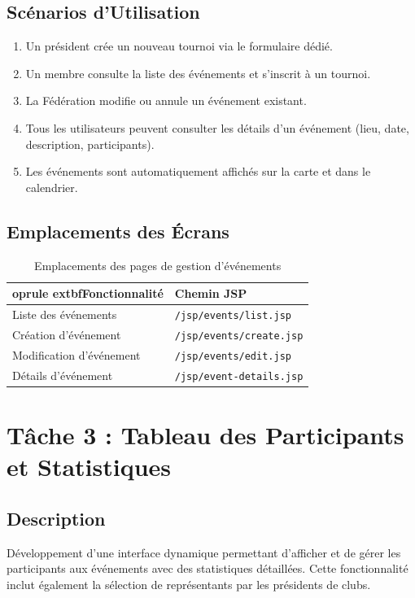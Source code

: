 \documentclass[12pt,a4paper]{article}
\begin{document}
\subsection{Scénarios d'Utilisation}
\begin{enumerate}
    \item Un président crée un nouveau tournoi via le formulaire dédié.
    \item Un membre consulte la liste des événements et s'inscrit à un tournoi.
    \item La Fédération modifie ou annule un événement existant.
    \item Tous les utilisateurs peuvent consulter les détails d'un événement (lieu, date, description, participants).
    \item Les événements sont automatiquement affichés sur la carte et dans le calendrier.
\end{enumerate}

\subsection{Emplacements des Écrans}
\begin{table}[h]
\centering
\begin{tabular}{ll}
	oprule
	extbf{Fonctionnalité} & \textbf{Chemin JSP} \\
\midrule
Liste des événements & \texttt{/jsp/events/list.jsp} \\
Création d'événement & \texttt{/jsp/events/create.jsp} \\
Modification d'événement & \texttt{/jsp/events/edit.jsp} \\
Détails d'événement & \texttt{/jsp/event-details.jsp} \\
\bottomrule
\end{tabular}
\caption{Emplacements des pages de gestion d'événements}
\end{table}

\section{Tâche 3 : Tableau des Participants et Statistiques}

\subsection{Description}

Développement d'une interface dynamique permettant d'afficher et de gérer les participants aux événements avec des statistiques détaillées. Cette fonctionnalité inclut également la sélection de représentants par les présidents de clubs.
\end{document}
